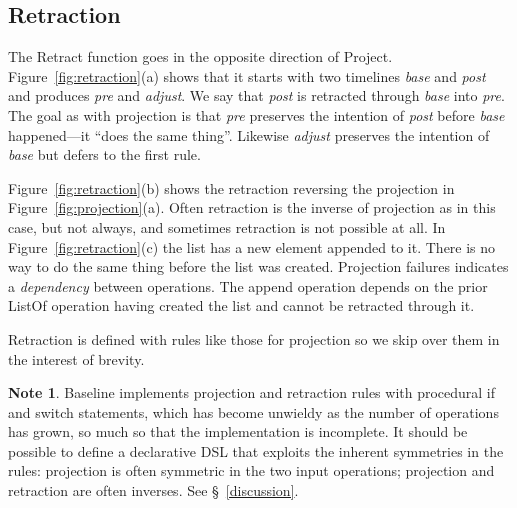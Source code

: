 \documentclass[english,submission]{programming}
\theoremstyle{definition}
\newtheorem*{note}{Note}
\begin{document}
\subsection{Retraction}

The \textsf{Retract} function goes in the opposite direction of \textsf{Project}. Figure~\ref{fig:retraction}(a) shows that it starts with two timelines \textit{base} and \textit{post} and produces \textit{pre} and \textit{adjust}. We say that \textit{post} is retracted through \textit{base} into \textit{pre}. The goal as with projection is that \textit{pre} preserves the intention of \textit{post} before \textit{base} happened---it ``does the same thing''. Likewise \textit{adjust} preserves the intention of \textit{base} but defers to the first rule.

Figure~\ref{fig:retraction}(b) shows the retraction reversing the projection in Figure~\ref{fig:projection}(a). Often retraction is the inverse of projection as in this case, but not always, and sometimes retraction is not possible at all. In Figure~\ref{fig:retraction}(c) the list has a new element appended to it. There is no way to do the same thing before the list was created. Projection failures indicates a \textit{dependency} between operations. The \textsf{append} operation depends on the prior \textsf{ListOf} operation having created the list and cannot be retracted through it.

Retraction is defined with rules like those for projection so we skip over them in the interest of brevity.
\begin{note}
  Baseline implements projection and retraction rules with procedural if and switch statements, which has become unwieldy as the number of operations has grown, so much so that the implementation is incomplete. It should be possible to define a declarative DSL that exploits the inherent symmetries in the rules: projection is often symmetric in the two input operations; projection and retraction are often inverses. See \S~\ref{discussion}.
\end{note}
\end{document}
